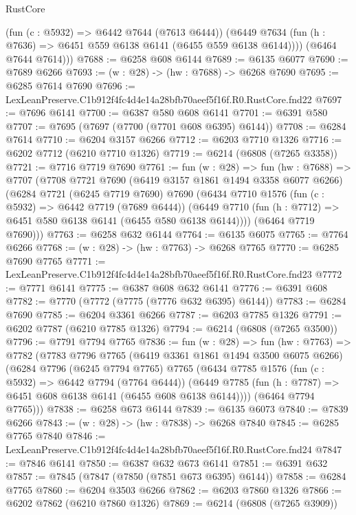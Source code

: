\begin{lexlean}{RustCore}
\begin{coremodule}
          (fun (c : @5932) => @6442 @7644 (@7613 @6444))
          (@6449 @7634 (fun (h : @7636) => @6451 @559 @6138 @6141 (@6455 @559 @6138 @6144))))
        (@6464 @7644 @7614)))
@7688 := @6258 @608 @6144
@7689 := @6135 @6077
@7690 := @7689 @6266
@7693 := (w : @28) -> (hw : @7688) -> @6268 @7690
@7695 := @6285 @7614 @7690
@7696 := LexLeanPreserve.C1b912f4fc4d4e14a28bfb70aeef5f16f.R0.RustCore.fnd22
@7697 := @7696 @6141
@7700 := @6387 @580 @608 @6141
@7701 := @6391 @580
@7707 := @7695 (@7697 (@7700 (@7701 @608 @6395) @6144))
@7708 := @6284 @7614
@7710 := @6204 @3157 @6266
@7712 := @6203 @7710 @1326
@7716 := @6202 @7712 (@6210 @7710 @1326)
@7719 := @6214 (@6808 (@7265 @3358))
@7721 := @7716 @7719 @7690
@7761 := fun (w : @28) =>
  fun (hw : @7688) =>
  @7707
    (@7708
      @7721
      @7690
      (@6419 @3157 @1861 @1494 @3358 @6077 @6266)
      (@6284
        @7721
        (@6245 @7719 @7690)
        @7690
        (@6434
          @7710
          @1576
          (fun (c : @5932) => @6442 @7719 (@7689 @6444))
          (@6449 @7710 (fun (h : @7712) => @6451 @580 @6138 @6141 (@6455 @580 @6138 @6144))))
        (@6464 @7719 @7690)))
@7763 := @6258 @632 @6144
@7764 := @6135 @6075
@7765 := @7764 @6266
@7768 := (w : @28) -> (hw : @7763) -> @6268 @7765
@7770 := @6285 @7690 @7765
@7771 := LexLeanPreserve.C1b912f4fc4d4e14a28bfb70aeef5f16f.R0.RustCore.fnd23
@7772 := @7771 @6141
@7775 := @6387 @608 @632 @6141
@7776 := @6391 @608
@7782 := @7770 (@7772 (@7775 (@7776 @632 @6395) @6144))
@7783 := @6284 @7690
@7785 := @6204 @3361 @6266
@7787 := @6203 @7785 @1326
@7791 := @6202 @7787 (@6210 @7785 @1326)
@7794 := @6214 (@6808 (@7265 @3500))
@7796 := @7791 @7794 @7765
@7836 := fun (w : @28) =>
  fun (hw : @7763) =>
  @7782
    (@7783
      @7796
      @7765
      (@6419 @3361 @1861 @1494 @3500 @6075 @6266)
      (@6284
        @7796
        (@6245 @7794 @7765)
        @7765
        (@6434
          @7785
          @1576
          (fun (c : @5932) => @6442 @7794 (@7764 @6444))
          (@6449 @7785 (fun (h : @7787) => @6451 @608 @6138 @6141 (@6455 @608 @6138 @6144))))
        (@6464 @7794 @7765)))
@7838 := @6258 @673 @6144
@7839 := @6135 @6073
@7840 := @7839 @6266
@7843 := (w : @28) -> (hw : @7838) -> @6268 @7840
@7845 := @6285 @7765 @7840
@7846 := LexLeanPreserve.C1b912f4fc4d4e14a28bfb70aeef5f16f.R0.RustCore.fnd24
@7847 := @7846 @6141
@7850 := @6387 @632 @673 @6141
@7851 := @6391 @632
@7857 := @7845 (@7847 (@7850 (@7851 @673 @6395) @6144))
@7858 := @6284 @7765
@7860 := @6204 @3503 @6266
@7862 := @6203 @7860 @1326
@7866 := @6202 @7862 (@6210 @7860 @1326)
@7869 := @6214 (@6808 (@7265 @3909))

\end{coremodule}
\end{lexlean}
